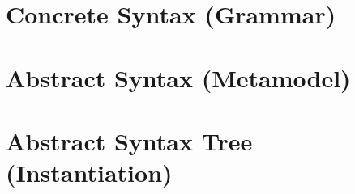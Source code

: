 \documentclass[a4paper,oneside,14pt, extrafontsizes]{memoir}
\begin{document}
\appendix

\chapter{Concrete Syntax (Grammar)}


\chapter{Abstract Syntax (Metamodel)}


\chapter{Abstract Syntax Tree (Instantiation)}


\backmatter



\end{document}
